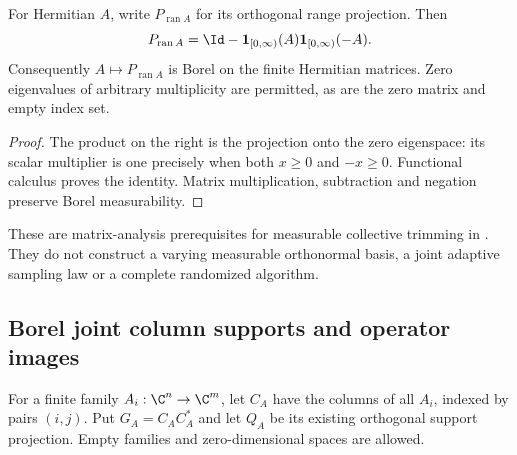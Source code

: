 \begin{lemma}
    \label{lem:borel_hermitian_range_projection}
    \leanok
    For Hermitian $A$, write $P_{\operatorname{ran}A}$ for its orthogonal
    range projection. Then
    \[
        P_{\operatorname{ran}A}
        =\Id-\mathbf1_{[0,\infty)}(A)
        \mathbf1_{[0,\infty)}(-A).
    \]
    Consequently $A\mapsto P_{\operatorname{ran}A}$ is Borel on the finite
    Hermitian matrices. Zero eigenvalues of arbitrary multiplicity are
    permitted, as are the zero matrix and empty index set.
\end{lemma}
\begin{proof}\leanok
    The product on the right is the projection onto the zero eigenspace:
    its scalar multiplier is one precisely when both $x\ge0$ and $-x\ge0$.
    Functional calculus proves the identity. Matrix multiplication,
    subtraction and negation preserve Borel measurability.
\end{proof}

These are matrix-analysis prerequisites for measurable collective trimming
in \cite[lines 646--655]{Arad2016RigorousRG}. They do not
construct a varying measurable orthonormal basis, a joint adaptive sampling
law or a complete randomized algorithm.


\subsection{Borel joint column supports and operator images}

\begin{definition}
    \label{def:finite_family_column_support}
    \leanok
    For a finite family $A_i:\C^n\to\C^m$, let $C_A$ have the columns of
    all $A_i$, indexed by pairs $(i,j)$. Put $G_A=C_AC_A^*$ and let
    $Q_A$ be its existing orthogonal support projection.
    Empty families and zero-dimensional spaces are allowed.
\end{definition}

